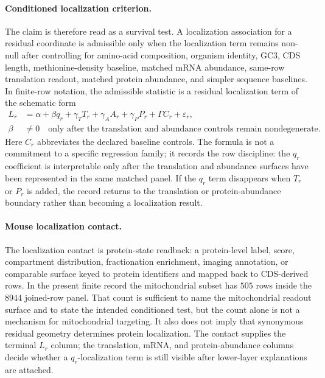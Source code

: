 \paragraph{Conditioned localization criterion.}
The claim is therefore read as a survival test.  A localization association for a residual coordinate is admissible only when the localization term remains non-null after controlling for amino-acid composition, organism identity, GC3, CDS length, methionine-density baseline, matched mRNA abundance, same-row translation readout, matched protein abundance, and simpler sequence baselines.  In finite-row notation, the admissible statistic is a residual localization term of the schematic form
$$
\begin{aligned}
L_r &= \alpha + \beta q_r + \gamma_T T_r + \gamma_A A_r + \gamma_P P_r + \Gamma C_r + \varepsilon_r,\\
\beta &\neq 0 \quad \text{only after the translation and abundance controls remain nondegenerate.}
\end{aligned}
$$
Here $C_r$ abbreviates the declared baseline controls.  The formula is not a commitment to a specific regression family; it records the row discipline: the $q_r$ coefficient is interpretable only after the translation and abundance surfaces have been represented in the same matched panel.  If the $q_r$ term disappears when $T_r$ or $P_r$ is added, the record returns to the translation or protein-abundance boundary rather than becoming a localization result.

\paragraph{Mouse localization contact.}
The localization contact is protein-state readback: a protein-level label, score, compartment distribution, fractionation enrichment, imaging annotation, or comparable surface keyed to protein identifiers and mapped back to CDS-derived rows.  In the present finite record the mitochondrial subset has $505$ rows inside the $8944$ joined-row panel.  That count is sufficient to name the mitochondrial readout surface and to state the intended conditioned test, but the count alone is not a mechanism for mitochondrial targeting.  It also does not imply that synonymous residual geometry determines protein localization.  The contact supplies the terminal $L_r$ column; the translation, mRNA, and protein-abundance columns decide whether a $q_r$-localization term is still visible after lower-layer explanations are attached.

